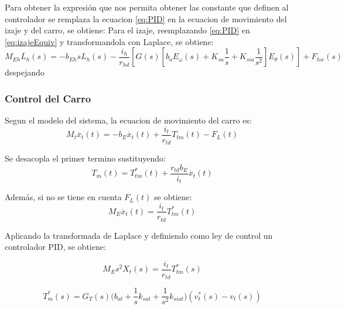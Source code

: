 \documentclass{article}
\begin{document}
            Para obtener la expresión que nos permita obtener las constante que definen al controlador se remplaza la ecuacion \ref{eq:PID} en la ecuacion de movimiento del izaje y del carro, se obtiene:
            Para el izaje, reemplazando \ref{eq:PID} en \ref{eq:izajeEquiv} y transformandola con Laplace, se obtiene:
            \begin{equation}\label{eq:izajeControl}
                M_{Eh} \ddot{L_h}(s) = - b_{Eh} sL_h(s) - \frac{i_h}{r_{hd}} [G(s)[b_aE_\omega(s) + K_{sa} \frac{1}{s} + K_{sia} \frac{1}{s^2}]E_\theta(s)] + F_{hw}(s)
            \end{equation}
            despejando 


        \subsubsection{Control del Carro}

            Segun el modelo del sistema, la ecuacion de movimiento del carro es:
            \begin{equation}
                M_t \ddot{x_{t}}(t) = - b_E \dot{x_{t}}(t) + \frac{i_t}{r_{td}} T_{tm}(t) - F_{L}(t) 
            \end{equation}

            Se desacopla el primer termino sustituyendo:
            \begin{equation}
            T_m(t) = T_{tm}^*(t) + \frac{r_{td} b_E}{i_t} \dot{x_t}(t)
            \end{equation}

            Además, si no se tiene en cuenta \(F_{L}(t)\) se obtiene:
            \begin{equation}
                M_E \ddot{x_{t}}(t) =  \frac{i_t}{r_{td}} T_{tm}^*(t) 
            \end{equation}

            Aplicando la transformada de Laplace y definiendo como ley de control un controlador PID, se obtiene:

            \begin{equation}
                M_E s^2 X_t(s) =  \frac{i_t}{r_{td}} T_{tm}^*(s)
            \end{equation}

            \begin{equation}
                T_m^*(s) = G_T(s)\Big( b_{at} + \frac{1}{s} k_{sat} + \frac{1}{s^2} k_{siat} \Big)(v_t^*(s) - v_t(s))
            \end{equation}
\end{document}
